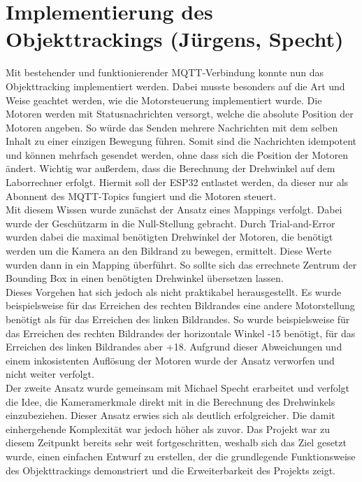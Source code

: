 \section{Implementierung des Objekttrackings (Jürgens, Specht)} \label{sec:objekttracking}
Mit bestehender und funktionierender MQTT-Verbindung konnte nun das Objekttracking implementiert werden. Dabei musste besonders auf die Art und Weise geachtet werden, wie die Motorsteuerung implementiert wurde. Die Motoren werden mit Statusnachrichten versorgt, welche die absolute Position der Motoren angeben. So würde das Senden mehrere Nachrichten mit dem selben Inhalt zu einer einzigen Bewegung führen. Somit sind die Nachrichten idempotent und können mehrfach gesendet werden, ohne dass sich die Position der Motoren ändert.
Wichtig war außerdem, dass die Berechnung der Drehwinkel auf dem Laborrechner erfolgt. Hiermit soll der ESP32 entlastet werden, da dieser nur als Abonnent des MQTT-Topics fungiert und die Motoren steuert. 
\\
Mit diesem Wissen wurde zunächst der Ansatz eines Mappings verfolgt. Dabei wurde der Geschützarm in die Null-Stellung gebracht. Durch Trial-and-Error wurden dabei die maximal benötigten Drehwinkel der Motoren, die benötigt werden um die Kamera an den Bildrand zu bewegen, ermittelt. Diese Werte wurden dann in ein Mapping überführt. So sollte sich das errechnete Zentrum der Bounding Box in einen benötigten Drehwinkel übersetzen lassen.\\
Dieses Vorgehen hat sich jedoch als nicht praktikabel herausgestellt. Es wurde beispielsweise für das Erreichen des rechten Bildrandes eine andere Motorstellung benötigt als für das Erreichen des linken Bildrandes. So wurde beispielsweise für das Erreichen des rechten Bildrandes der horizontale Winkel -15 benötigt, für das Erreichen des linken Bildrandes aber +18. Aufgrund dieser Abweichungen und einem inkosistenten Auflösung der Motoren wurde der Ansatz verworfen und nicht weiter verfolgt.
\\
Der zweite Ansatz wurde gemeinsam mit Michael Specht erarbeitet und verfolgt die Idee, die Kameramerkmale direkt mit in die Berechnung des Drehwinkels einzubeziehen. Dieser Ansatz erwies sich als deutlich erfolgreicher. Die damit einhergehende Komplexität war jedoch höher als zuvor. Das Projekt war zu diesem Zeitpunkt bereits sehr weit fortgeschritten, weshalb sich das Ziel gesetzt wurde, einen einfachen Entwurf zu erstellen, der die grundlegende Funktionsweise des Objekttrackings demonstriert und die Erweiterbarkeit des Projekts zeigt. \newline

